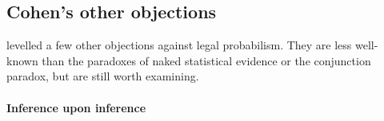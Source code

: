 \documentclass{article}
\begin{document}






\subsection{Cohen's other objections}


\cite{Cohen1977The-probable-an} levelled a few other objections against legal probabilism. They are less well-known than the paradoxes of naked statistical evidence or the conjunction paradox, but are still worth examining. 

\paragraph{Inference upon inference}
\end{document}
